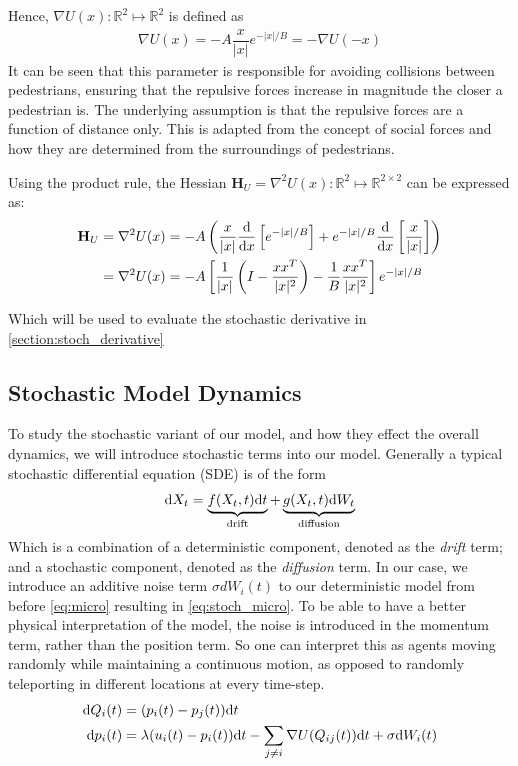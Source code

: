Hence, $\nabla U(x):\mathbb{R}^2 \mapsto \mathbb{R}^2$ is defined as
\begin{align} 
    \nabla U(x) = -A\dfrac{x}{|x|}e^{-|x|/B} = -\nabla U(-x)
    \label{eq:def_U}
\end{align}
It can be seen that this parameter is responsible for avoiding collisions between pedestrians, ensuring that the repulsive forces increase in magnitude the closer a pedestrian is. The underlying assumption is that the repulsive forces are a function of distance only. This is adapted from the concept of social forces and how they are determined from the surroundings of pedestrians.

Using the product rule, the Hessian $\mathbf{H}_U = \nabla ^2 U(x):\mathbb{R}^2 \mapsto \mathbb{R}^{2\times2}$ can be expressed as:
\begin{align}
    \mathbf{H}_U &= \nabla^2 U(x) = -A\left(\dfrac{x}{|x|}\dfrac{\mathrm d}{\mathrm d x} \left[ e^{-|x|/B} \right] + e^{-|x|/B}\dfrac{\mathrm d}{\mathrm d x} \left[\dfrac{x}{|x|}\right]\right) \nonumber \\ 
    &= \nabla^2 U(x) = -A\left[\dfrac{1}{|x|}\left(I - \dfrac{xx^T}{|x|^2}\right) - \dfrac{1}{B}\dfrac{xx^T}{|x|^2}\right]e^{-|x|/B}
    \label{eq:def_ddU}
\end{align}

Which will be used to evaluate the stochastic derivative in \autoref{section:stoch_derivative}

\subsection{Stochastic Model Dynamics}

To study the stochastic variant of our model, and how they effect the overall dynamics, we will introduce stochastic terms into our model. Generally a typical stochastic differential equation (SDE) is of the form
\begin{equation*}
    \mathrm d X_t = \underbrace{f(X_t, t)\mathrm d t}_{\text{drift}} + \underbrace{g(X_t, t)\mathrm d W_t}_{\text{diffusion}}
\end{equation*}
Which is a combination of a deterministic component, denoted as the \textit{drift} term; and a stochastic component, denoted as the \textit{diffusion} term. In our case, we introduce an additive noise term $\sigma dW_i(t)$ to our deterministic model from before \autoref{eq:micro} resulting in \autoref{eq:stoch_micro}. To be able to have a better physical interpretation of the model, the noise is introduced in the momentum term, rather than the position term. So one can interpret this as agents moving randomly while maintaining a continuous motion, as opposed to randomly teleporting in different locations at every time-step.
\begin{gather}
\begin{aligned}
    \mathrm d Q_{i}(t) &= (p_i(t) - p_j(t))\mathrm d t \\
    \mathrm d p_i(t) &= \lambda(u_i(t) - p_i(t))\mathrm d t - \sum_{j \neq i} \nabla U (Q_{ij}(t))\mathrm d t + \sigma \mathrm d W_i(t)
    \label{eq:stoch_micro}
\end{aligned}
\end{gather}

